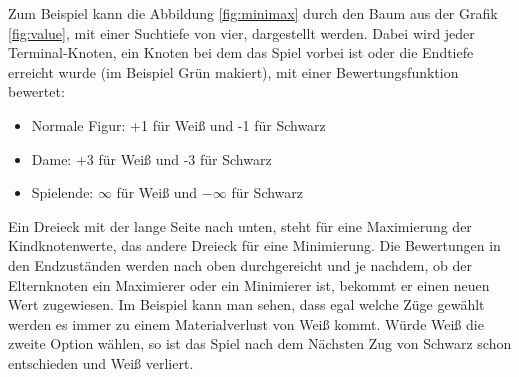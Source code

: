 \documentclass[12pt,a4paper,bibliography=totocnumbered,listof=totocnumbered]{article}
\begin{document}
Zum Beispiel kann die Abbildung \ref{fig:minimax} durch den Baum aus der Grafik \ref{fig:value}, mit einer Suchtiefe von vier, dargestellt werden.
Dabei wird jeder Terminal-Knoten, ein Knoten bei dem das Spiel vorbei ist oder die Endtiefe erreicht wurde (im Beispiel Grün makiert), 
mit einer Bewertungsfunktion bewertet:
\begin{itemize}
    \item Normale Figur: +1 für Weiß und -1 für Schwarz
    \item Dame: +3 für Weiß und -3 für Schwarz
    \item Spielende: $\infty$ für Weiß und $-\infty$ für Schwarz
\end{itemize} 
Ein Dreieck mit der lange Seite nach unten, steht für eine Maximierung der Kindknotenwerte, das andere Dreieck für eine
Minimierung. Die Bewertungen in den Endzuständen werden nach oben durchgereicht und je nachdem, ob der Elternknoten ein Maximierer oder ein
Minimierer ist, bekommt er einen neuen Wert zugewiesen.
Im Beispiel kann man sehen, dass egal welche Züge gewählt werden es immer zu einem Materialverlust von Weiß kommt. Würde Weiß
die zweite Option wählen, so ist das Spiel nach dem Nächsten Zug von Schwarz schon entschieden und Weiß verliert. 
\end{document}
